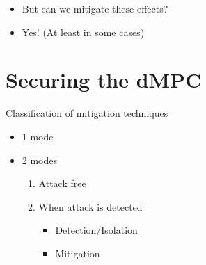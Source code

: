 \documentclass[aspectratio=169]{beamer}
\begin{document}
\begin{frame}{}
  \begin{itemize}[<+(1)->]
    \item But can we mitigate these effects?
    \item Yes! (At least in some cases)
  \end{itemize}
\end{frame}

\section{Securing the dMPC}

\begin{frame}{Classification of mitigation techniques}
  \begin{minipage}[t]{.45\linewidth}
    \begin{itemize}
      \item<2-> 1 mode
    \end{itemize}
  \end{minipage}
  \hfill
  \begin{minipage}[t]{.45\linewidth}
    \begin{itemize}
      \item<2-> 2 modes
            \begin{enumerate}
              \item<3-> Attack free
              \item<3-> When attack is detected
                    \begin{itemize}
                      \item<4-> Detection/Isolation
                      \item<4-> Mitigation
                    \end{itemize}
            \end{enumerate}
    \end{itemize}
  \end{minipage}
\end{frame}
\end{document}
